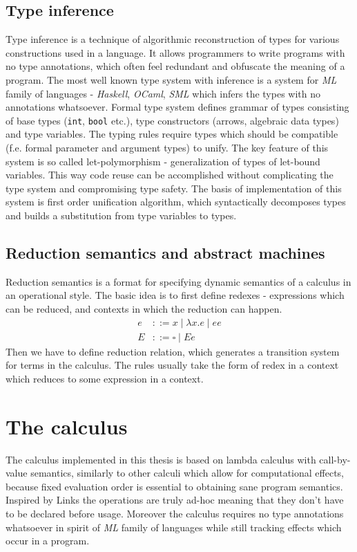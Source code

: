 \documentclass[inz, english, shortabstract]{iithesis}
\begin{document}
\section{Type inference}
Type inference is a technique of algorithmic reconstruction of types for various constructions used in a language.
It allows programmers to write programs with no type annotations, which often feel redundant and obfuscate the meaning of a program.
The most well known type system with inference is a system for \emph{ML} family of languages - \emph{Haskell}, \emph{OCaml}, \emph{SML} which infers the types with no annotations whatsoever.
Formal type system defines grammar of types consisting of base types (\texttt{int}, \texttt{bool} etc.), type constructors (arrows, algebraic data types) and type variables.
The typing rules require types which should be compatible (f.e. formal parameter and argument types) to unify.
The key feature of this system is so called let-polymorphism - generalization of types of let-bound variables.
This way code reuse can be accomplished without complicating the type system and compromising type safety.
The basis of implementation of this system is first order unification algorithm, which syntactically decomposes types and builds a substitution from type variables to types.

\section{Reduction semantics and abstract machines}
Reduction semantics is a format for specifying dynamic semantics of a calculus in an operational style.
The basic idea is to first define redexes - expressions which can be reduced, and contexts in which the reduction can happen.
\begin{align*}
  e &::= x \mid \lambda x . e \mid e e \\
  E &::= \square \mid E e
\end{align*}
Then we have to define reduction relation, which generates a transition system for terms in the calculus.
The rules usually take the form of redex in a context which reduces to some expression in a context.

\chapter{The calculus}
The calculus implemented in this thesis is based on lambda calculus with call-by-value semantics, similarly to other calculi which allow for computational effects, because fixed evaluation order is essential to obtaining sane program semantics.
Inspired by Links \cite{Hillerstrom2016} the operations are truly ad-hoc meaning that they don't have to be declared before usage.
Moreover the calculus requires no type annotations whatsoever in spirit of \emph{ML} family of languages while still tracking effects which occur in a program.
\end{document}

